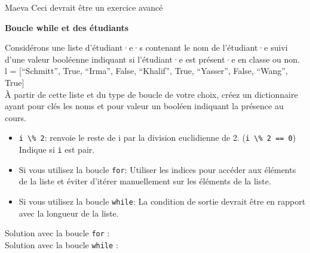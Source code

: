  \begin{note}{Maeva}
    Ceci devrait être un exercice avancé
\end{note}
    \begin{Exercice}[10 minutes] \textbf{Boucle while et des étudiants}
      	
      	Considérons une liste d'étudiant·e·s contenant le nom de l'étudiant·e suivi d'une valeur booléenne indiquant si l'étudiant·e est présent·e en classe ou non. \\
      	
      	l = [``Schmitt'', True, ``Irma'', False, ``Khalif'', True, ``Yasser'', False, ``Wang'', True] \\
      	
      	À partir de cette liste et du type de boucle de votre choix, créez un dictionnaire ayant pour clés les noms et pour valeur un booléen indiquant la présence au cours.
    
        \begin{conseil}
           \begin{itemize}
           		\item \lstinline{i \% 2}: renvoie le reste de i par la division euclidienne de 2. (\lstinline{i \% 2 == 0}) Indique si \lstinline{i} est pair.
           	\item Si vous utilisez la boucle \lstinline{for}: Utiliser les indices pour accéder aux éléments de la liste et éviter d'itérer manuellement sur les éléments de la liste.
           	\item Si vous utilisez la boucle \lstinline{while}: La condition de sortie devrait être en rapport avec la longueur de la liste.
           \end{itemize}
		     
        \end{conseil}
        
        \begin{solution}
        	Solution avec la boucle \lstinline{for} : \\
        
            
            
            Solution avec la boucle \lstinline{while} :
            
            
            

\end{solution}
\end{Exercice}
